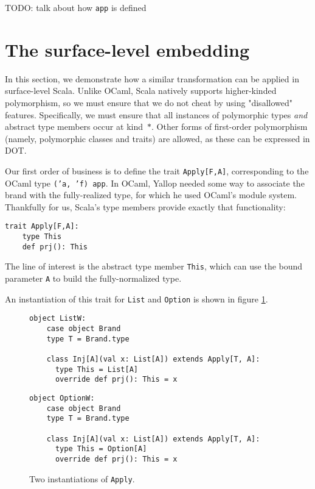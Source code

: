 \documentclass[acmsmall,screen]{acmart}
\begin{document}
TODO: talk about how \texttt{app} is defined

\section{The surface-level embedding}\label{sec::surface}

In this section, we demonstrate how a similar transformation can be applied in
surface-level Scala. Unlike OCaml, Scala natively supports higher-kinded
polymorphism, so we must ensure that we do not cheat by using "disallowed"
features. Specifically, we must ensure that all instances of polymorphic types
\emph{and} abstract type members occur at kind~$*$. Other forms of first-order
polymorphism (namely, polymorphic classes and traits) are allowed, as these can
be expressed in DOT.

Our first order of business is to define the trait \texttt{Apply[F,A]},
corresponding to the OCaml type \texttt{('a, 'f) app}. In OCaml, Yallop needed
some way to associate the brand with the fully-realized type, for which he used
OCaml's module system. Thankfully for us, Scala's type members provide exactly
that functionality:

\begin{lstlisting}[style=scala]
  trait Apply[F,A]:
    type This
    def prj(): This
\end{lstlisting}

The line of interest is the abstract type member \texttt{This}, which can use
the bound parameter \texttt{A} to build the fully-normalized type.

An instantiation of this trait for \texttt{List} and \texttt{Option} is shown
in figure \ref{fig::instantiation}.

\begin{figure}[ht]
  \begin{minipage}{0.45\textwidth}
    \begin{lstlisting}[style=scala]
  object ListW:
    case object Brand
    type T = Brand.type

    class Inj[A](val x: List[A]) extends Apply[T, A]:
      type This = List[A]
      override def prj(): This = x
    \end{lstlisting}
  \end{minipage}
  \hfill
  \begin{minipage}{0.45\textwidth}
    \begin{lstlisting}[style=scala]
  object OptionW:
    case object Brand
    type T = Brand.type

    class Inj[A](val x: List[A]) extends Apply[T, A]:
      type This = Option[A]
      override def prj(): This = x
    \end{lstlisting}
  \end{minipage}
  \caption{Two instantiations of \texttt{Apply}.}\label{fig::instantiation}
\end{figure}
\end{document}

